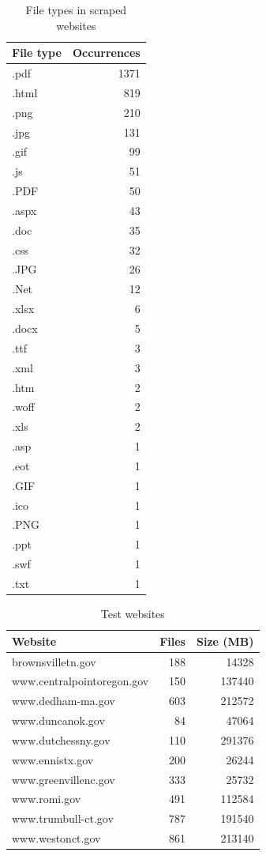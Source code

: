 \documentclass[11pt]{article}
\begin{document}
\begin{table}[ht]
	\centering
	\begin{tabular}{lr}
		\hline
		File type & Occurrences \\ 
		\hline
		.pdf & 1371 \\ 
		.html & 819 \\ 
		.png & 210 \\ 
		.jpg & 131 \\ 
		.gif &  99 \\ 
		.js &  51 \\ 
		.PDF &  50 \\ 
		.aspx &  43 \\ 
		.doc &  35 \\ 
		.css &  32 \\ 
		.JPG &  26 \\ 
		.Net &  12 \\ 
		.xlsx &   6 \\ 
		.docx &   5 \\ 
		.ttf &   3 \\ 
		.xml &   3 \\ 
		.htm &   2 \\ 
		.woff &   2 \\ 
		.xls &   2 \\ 
		.asp &   1 \\ 
		.eot &   1 \\ 
		.GIF &   1 \\ 
		.ico &   1 \\ 
		.PNG &   1 \\ 
		.ppt &   1 \\ 
		.swf &   1 \\ 
		.txt &   1 \\ 
		\hline
	\end{tabular}
	\caption{File types in scraped websites} 
\end{table}

\begin{table}[ht]
	\centering
	\begin{tabular}{lrr}
		\hline
		Website & Files & Size (MB) \\ 
		\hline
		brownsvilletn.gov & 188 & 14328 \\ 
		www.centralpointoregon.gov & 150 & 137440 \\ 
		www.dedham-ma.gov & 603 & 212572 \\ 
		www.duncanok.gov &  84 & 47064 \\ 
		www.dutchessny.gov & 110 & 291376 \\ 
		www.ennistx.gov & 200 & 26244 \\ 
		www.greenvillenc.gov & 333 & 25732 \\ 
		www.romi.gov & 491 & 112584 \\ 
		www.trumbull-ct.gov & 787 & 191540 \\ 
		www.westonct.gov & 861 & 213140 \\ 
		\hline
	\end{tabular}
	\caption{Test websites} 
\end{table}
\end{document}
